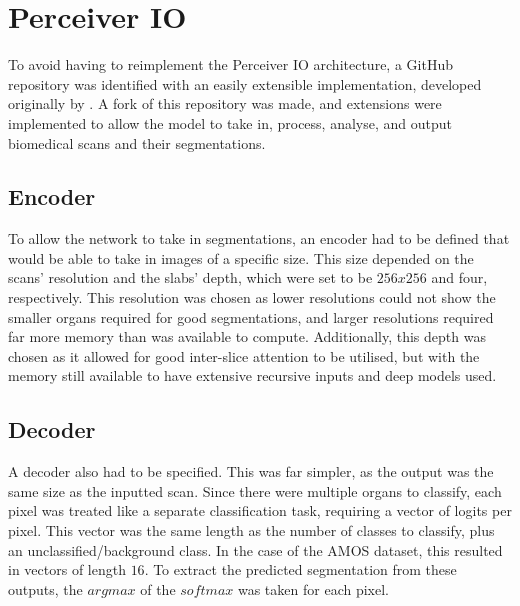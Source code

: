 \documentclass{l4proj}
\begin{document}




\section{Perceiver IO}

To avoid having to reimplement the Perceiver IO architecture, a GitHub repository was identified with an easily extensible implementation, developed originally by \cite{Krasser_A_PyTorch_implementation_2023}. A fork of this repository was made, and extensions were implemented to allow the model to take in, process, analyse, and output biomedical scans and their segmentations.

\subsection{Encoder}

To allow the network to take in segmentations, an encoder had to be defined that would be able to take in images of a specific size. This size depended on the scans' resolution and the slabs' depth, which were set to be $256x256$ and four, respectively. This resolution was chosen as lower resolutions could not show the smaller organs required for good segmentations, and larger resolutions required far more memory than was available to compute. Additionally, this depth was chosen as it allowed for good inter-slice attention to be utilised, but with the memory still available to have extensive recursive inputs and deep models used.

\subsection{Decoder}

A decoder also had to be specified. This was far simpler, as the output was the same size as the inputted scan. Since there were multiple organs to classify, each pixel was treated like a separate classification task, requiring a vector of logits per pixel. This vector was the same length as the number of classes to classify, plus an unclassified/background class. In the case of the AMOS dataset, this resulted in vectors of length $16$. To extract the predicted segmentation from these outputs, the $argmax$ of the $softmax$ was taken for each pixel.
\end{document}
